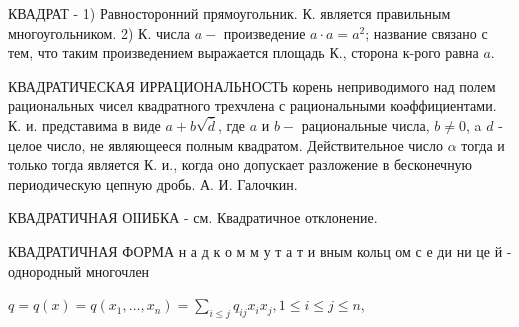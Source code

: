 \documentclass[10pt]{article}
\begin{document}
КВАДРАТ - 1) Равносторонний прямоугольник. К. является правильным многоугольником. 2) К. числа $a-$ произведение $a \cdot a=a^{2}$; название связано с тем, что таким произведением выражается площадь К., сторона к-рого равна $a$.



КВАДРАТИЧЕСКАЯ ИРРАЦИОНАЛЬНОСТЬ корень неприводимого над полем рациональных чисел квадратного трехчлена с рациональными коәффициентами. К. и. представима в виде $a+b \sqrt{\bar{d}}$, где $a$ и $b-$ рациональные числа, $b \neq 0$, a $d$ - целое число, не являющееся полным квадратом. Действительное число $\alpha$ тогда и только тогда является К. и., когда оно допускает разложение в бесконечную периодическую цепную дробь. А. И. Галочкин.



КВАДРАТИЧНАЯ ОІІИБКА - см. Квадратичное отклонение.



КВАДРАТИЧНАЯ ФОРМА н а д к о м м у т а т и вным кольц ом с е ди ни це й - однородный многочлен



$q=q(x)=q\left(x_{1}, \ldots, x_{n}\right)=\sum_{i \leqslant j} q_{i j} x_{i} x_{j}, 1 \leqslant i \leqslant j \leqslant n$,
\end{document}
